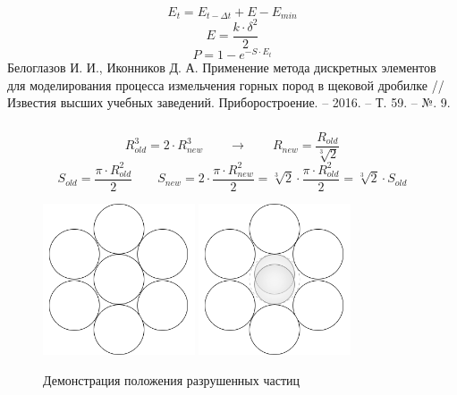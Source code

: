 \documentclass[c]{beamer}  %
\begin{document}
\begin{frame}
\frametitle{\insertsection} 
\framesubtitle{\insertsubsection}
\begin{equation}
E_t = E_{t-\Delta t} + E - E_{min}
\end{equation}
\begin{equation}
E = \frac{k \cdot \delta^2}{2}
\end{equation}
\begin{equation}
P = 1 - e^{-S \cdot E_t} 
\end{equation}
Белоглазов И. И., Иконников Д. А. Применение метода дискретных элементов для моделирования процесса измельчения горных пород в щековой дробилке //Известия высших учебных заведений. Приборостроение. – 2016. – Т. 59. – №. 9.
\end{frame}


\begin{frame}
\frametitle{\insertsection} 
\framesubtitle{\insertsubsection}
\begin{equation*}
R_{old}^3 = 2 \cdot R^3_{new} \qquad \rightarrow \qquad R_{new} =\frac{R_{old}}{\sqrt[3]{2}}
\end{equation*}
\begin{equation*}
S_{old} = \frac{\pi \cdot R_{old}^2}{2} \qquad S_{new} = 2 \cdot \frac{\pi \cdot R_{new}^2}{2} = \sqrt[3]{2} \cdot \frac{\pi \cdot R_{old}^2}{2} = \sqrt[3]{2} \cdot S_{old}
\end{equation*}
\begin{figure}[h!]
	\centering
	\includegraphics[width=0.4\textwidth]{1_balls}
	\includegraphics[width=0.4\textwidth]{2_balls}
	\caption{Демонстрация положения разрушенных частиц}
\end{figure} 
\end{frame}
\end{document}
